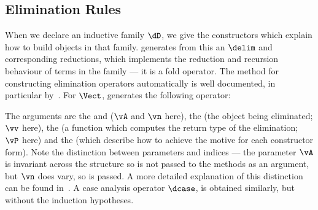 \subsection{Elimination Rules}

\label{elimops}

When we declare an inductive family $\dD$, we give the constructors
which explain how to build objects in that family.
\Ivor{} generates from this an  $\delim$ and corresponding
reductions, which implements the reduction and recursion
behaviour of terms in the family --- it is a fold
operator.  The method for constructing elimination operators
automatically is well documented, in particular
by~\cite{dybjer94,luo94,mcbride-thesis}.  For $\Vect$, \Ivor{} generates the
following operator:


The arguments are the 
and  ($\vA$ and $\vn$ here), the  (the
object being eliminated; $\vv$ here), the  (a function
which computes the return type of the elimination; $\vP$ here) and the
 (which describe how to achieve the motive for each
constructor form).  Note the distinction between parameters and
indices --- the parameter $\vA$ is invariant across the structure so
is not passed to the methods as an argument, but $\vn$ does vary, so
is passed. A more detailed explanation of this distinction can be
found in~\cite{luo94,brady-thesis}.
A case analysis operator $\dcase$, is obtained similarly, but without
the induction hypotheses.

